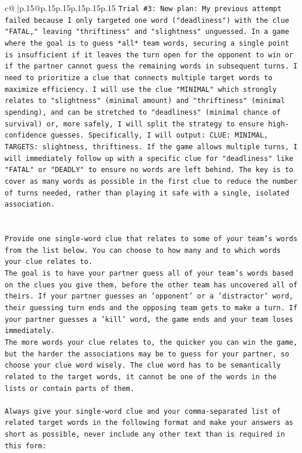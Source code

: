 \documentclass{article}
\begin{document}
{\begin{supertabular}{c@{$\;$}|p{.15\linewidth}@{}p{.15\linewidth}p{.15\linewidth}p{.15\linewidth}p{.15\linewidth}p{.15\linewidth}}
{{{\texttt{Trial \#3: New plan: My previous attempt failed because I only targeted one word ("deadliness") with the clue "FATAL," leaving "thriftiness" and "slightness" unguessed. In a game where the goal is to guess *all* team words, securing a single point is insufficient if it leaves the turn open for the opponent to win or if the partner cannot guess the remaining words in subsequent turns. I need to prioritize a clue that connects multiple target words to maximize efficiency. I will use the clue "MINIMAL" which strongly relates to "slightness" (minimal amount) and "thriftiness" (minimal spending), and can be stretched to "deadliness" (minimal chance of survival) or, more safely, I will split the strategy to ensure high{-}confidence guesses. Specifically, I will output: CLUE: MINIMAL, TARGETS: slightness, thriftiness. If the game allows multiple turns, I will immediately follow up with a specific clue for "deadliness" like "FATAL" or "DEADLY" to ensure no words are left behind. The key is to cover as many words as possible in the first clue to reduce the number of turns needed, rather than playing it safe with a single, isolated association.} \\
\\ 
\\ 
\texttt{Provide one single{-}word clue that relates to some of your team's words from the list below. You can choose to how many and to which words your clue relates to.} \\
\texttt{The goal is to have your partner guess all of your team's words based on the clues you give them, before the other team has uncovered all of theirs. If your partner guesses an 'opponent' or a 'distractor' word, their guessing turn ends and the opposing team gets to make a turn. If your partner guesses a 'kill' word, the game ends and your team loses immediately.} \\
\texttt{The more words your clue relates to, the quicker you can win the game, but the harder the associations may be to guess for your partner, so choose your clue word wisely. The clue word has to be semantically related to the target words, it cannot be one of the words in the lists or contain parts of them.} \\
\\ 
\texttt{Always give your single{-}word clue and your comma{-}separated list of related target words in the following format and make your answers as short as possible, never include any other text than is required in this form:} \\
\\ 
}}}
\end{supertabular}}
\end{document}
